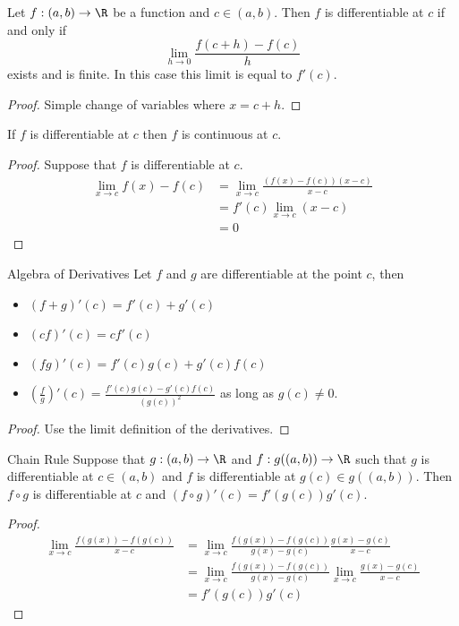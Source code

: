 \begin{prp}{}{} Let $f:(a,b)\to\R$ be a function and $c\in(a,b)$. Then $f$ is differentiable at $c$ if and only if $$\lim_{h\to 0}\frac{f(c+h)-f(c)}{h}$$ exists and is finite. In this case this limit is equal to $f'(c)$. \tcbline
\begin{proof}
Simple change of variables where $x=c+h$. 
\end{proof}
\end{prp}

\begin{prp}{}{} If $f$ is differentiable at $c$ then $f$ is continuous at $c$. \tcbline
\begin{proof} Suppose that $f$ is differentiable at $c$. 
\begin{align*}
\lim_{x\to c}f(x)-f(c)&=\lim_{x\to c}\frac{(f(x)-f(c))(x-c)}{x-c}\\
&=f'(c)\lim_{x\to c}(x-c)\\
&=0
\end{align*}
\end{proof}
\end{prp}

\begin{thm}{Algebra of Derivatives}{} Let $f$ and $g$ are differentiable at the point $c$, then
\begin{itemize}
\item $(f+g)'(c)=f'(c)+g'(c)$
\item $(cf)'(c)=cf'(c)$
\item $(fg)'(c)=f'(c)g(c)+g'(c)f(c)$
\item $\left(\frac{f}{g}\right)'(c)=\frac{f'(c)g(c)-g'(c)f(c)}{\left(g(c)\right)^2}$ as long as $g(c)\neq 0$. 
\end{itemize}\tcbline
\begin{proof} Use the limit definition of the derivatives. 
\end{proof}
\end{thm}

\begin{thm}{Chain Rule}{} Suppose that $g:(a,b)\to\R$ and $f:g((a,b))\to\R$ such that $g$ is differentiable at $c\in(a,b)$ and $f$ is differentiable at $g(c)\in g((a,b))$. Then $f\circ g$ is differentiable at $c$ and $(f\circ g)'(c)=f'(g(c))g'(c)$. \tcbline
\begin{proof}
\begin{align*}
\lim_{x\to c}\frac{f(g(x))-f(g(c))}{x-c}&=\lim_{x\to c}\frac{f(g(x))-f(g(c))}{g(x)-g(c)}\frac{g(x)-g(c)}{x-c}\\
&=\lim_{x\to c}\frac{f(g(x))-f(g(c))}{g(x)-g(c)}\lim_{x\to c}\frac{g(x)-g(c)}{x-c}\\
&=f'(g(c))g'(c)
\end{align*}
\end{proof}
\end{thm}

